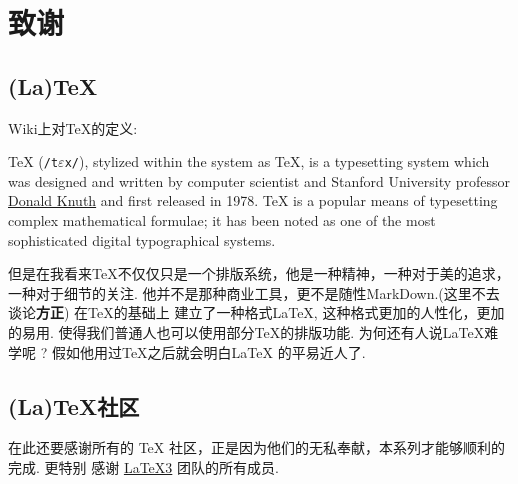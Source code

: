 \chapter{致谢}
\section{(L\hbox{a})\TeX{}}
Wiki上对\TeX{}的定义:
\begin{leftbar}
    TeX (\texttt{/t$\varepsilon$x/}), stylized within the system as \TeX{}, is a typesetting system which was designed 
    and written by computer scientist and Stanford University professor \href{https://en.wikipedia.org/wiki/Donald_Knuth}{Donald Knuth} 
    and first released in 1978. \TeX{} is a popular means of typesetting complex mathematical formulae; 
    it has been noted as one of the most sophisticated digital typographical systems.
\end{leftbar}

但是在我看来\TeX{}不仅仅只是一个排版系统，他是一种精神，一种对于美的追求，一种对于细节的关注.
他并不是那种商业工具，更不是随性MarkDown.(这里不去谈论\textbf{方正}) 在\TeX{}的基础上
建立了一种格式\LaTeX{}, 这种格式更加的人性化，更加的易用. 使得我们普通人也可以使用部分\TeX{}的排版功能.
为何还有人说\LaTeX{}难学呢 ? 假如他用过\TeX{}之后就会明白\LaTeX{} 的平易近人了.


\section{(L\hbox{a})\TeX{}社区}
在此还要感谢所有的 \TeX{} 社区，正是因为他们的无私奉献，本系列才能够顺利的完成. 更特别
感谢 \href{https://www.latex-project.org/latex3/}{\LaTeX3} 团队的所有成员.